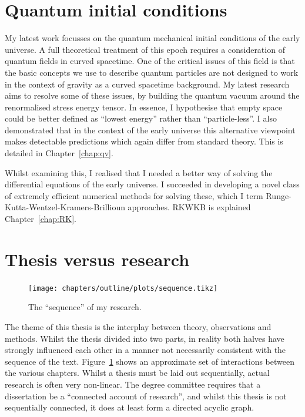 \section{Quantum initial conditions}
My latest work focusses on the quantum mechanical initial conditions of the early universe. A full theoretical treatment of this epoch requires a consideration of quantum fields in curved spacetime. One of the critical issues of this field is that the basic concepts we use to describe quantum particles are not designed to work in the context of gravity as a curved spacetime background. My latest research aims to resolve some of these issues, by building the quantum vacuum around the renormalised stress energy tensor. In essence, I hypothesise that empty space could be better defined as ``lowest energy'' rather than ``particle-less''. I also demonstrated that in the context of the early universe this alternative viewpoint makes detectable predictions which again differ from standard theory. This is detailed in Chapter~\ref{chap:qv}.

Whilst examining this, I realised that I needed a better way of solving the differential equations of the early universe. I succeeded in developing a novel class of extremely efficient numerical methods for solving these, which I term Runge-Kutta-Wentzel-Kramers-Brillioun approaches. RKWKB is explained Chapter~\ref{chap:RK}.

\section{Thesis versus research}
\begin{figure}[tp]
  \centering
  \texttt{[image: chapters/outline/plots/sequence.tikz]}
  \caption{The ``sequence'' of my research.}\label{fig:out:sequence}
\end{figure}

The theme of this thesis is the interplay between theory, observations and methods. Whilst the thesis divided into two parts, in reality both halves have strongly influenced each other in a manner not necessarily consistent with the sequence of the text. Figure~\ref{fig:out:sequence} shows an approximate set of interactions between the various chapters. Whilst a thesis must be laid out sequentially, actual research is often very non-linear. The degree committee requires that a dissertation be a ``connected account of research'', and whilst this thesis is not sequentially connected, it does at least form a directed acyclic graph.
